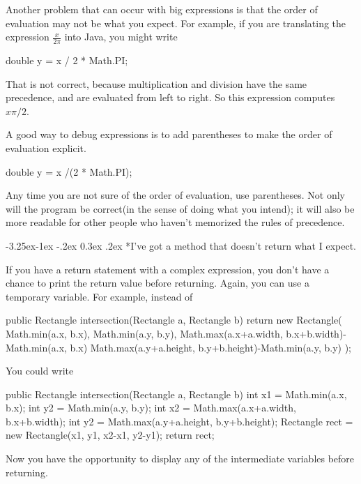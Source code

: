 \documentclass{book}
\makeatletter
\renewcommand\subsection{\@startsection {subsection}{2}{0mm}%
    {-3.25ex\@plus -1ex \@minus -.2ex}%
    {0.3ex \@plus .2ex}%
    {\normalfont\large\bfseries}}
\makeatother
\begin{document}

Another problem that can occur with big expressions is
that the order of evaluation may not be what you expect.
For example, if you are translating the expression
$\frac{x}{2 \pi}$ into Java, you might write

\begin{verbatimtab}
double y = x / 2 * Math.PI;
\end{verbatimtab}
%
That is not correct, because multiplication and division have
the same precedence, and are evaluated from left to right.
So this expression computes $x \pi / 2$.

A good way to debug expressions is to add parentheses to make
the order of evaluation explicit.

\begin{verbatimtab}
double y = x /(2 * Math.PI);
\end{verbatimtab}
%
Any time you are not sure of the order of evaluation, use
parentheses.  Not only will the program be correct(in the sense
of doing what you intend); it will also be more readable for
other people who haven't memorized the rules of precedence.



\subsection*{I've got a method that doesn't return what I
expect.}

If you have a return statement with a complex expression,
you don't have a chance to print the return value before
returning.  Again, you can use a temporary variable.  For
example, instead of

\begin{verbatimtab}
public Rectangle intersection(Rectangle a, Rectangle b) { 
    return new Rectangle(
        Math.min(a.x, b.x),
        Math.min(a.y, b.y),
        Math.max(a.x+a.width, b.x+b.width)-Math.min(a.x, b.x)
        Math.max(a.y+a.height, b.y+b.height)-Math.min(a.y, b.y) );
}
\end{verbatimtab}
%
You could write

\begin{verbatimtab}
public Rectangle intersection(Rectangle a, Rectangle b) { 
    int x1 = Math.min(a.x, b.x);
    int y2 = Math.min(a.y, b.y);
    int x2 = Math.max(a.x+a.width, b.x+b.width);
    int y2 = Math.max(a.y+a.height, b.y+b.height);
    Rectangle rect = new Rectangle(x1, y1, x2-x1, y2-y1);
    return rect;
}
\end{verbatimtab}
%
Now you have the opportunity to display any of
the intermediate variables before returning.
\end{document}
